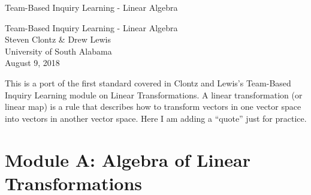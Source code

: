 \documentclass[10pt,]{book}
\theoremstyle{ptxplainnotitle}
\theoremstyle{ptxplaintitle}
\theoremstyle{ptxdefinitionnotitle}
\theoremstyle{ptxdefinitiontitle}
\theoremstyle{ptxdefinitionnotitle}
\theoremstyle{ptxdefinitiontitle}
\theoremstyle{ptxdefinitionnotitle}
\theoremstyle{ptxdefinitiontitle}
\theoremstyle{ptxdefinitionnotitle}
\theoremstyle{ptxdefinitiontitle}
\begin{document}
\frontmatter
\thispagestyle{empty}
{\centering
\vspace*{0.28\textheight}
{\Huge Team-Based Inquiry Learning - Linear Algebra}\\}
\clearpage
\thispagestyle{empty}
\null%
\clearpage
\thispagestyle{empty}
{\centering
\vspace*{0.14\textheight}
{\Huge Team-Based Inquiry Learning - Linear Algebra}\\[3\baselineskip]
{\Large Steven Clontz \& Drew Lewis}\\[0.5\baselineskip]
{\Large University of South Alabama}\\[3\baselineskip]
{\Large August 9, 2018}\\}
\clearpage
\thispagestyle{empty}
\null\clearpage
\hypertarget{p-1}{}%
This is a port of the first standard covered in Clontz and Lewis's Team-Based Inquiry Learning module on Linear Transformations.%
\setcounter{tocdepth}{1}
\renewcommand*\contentsname{Contents}
\tableofcontents
\mainmatter
\hypertarget{p-2}{}%
A linear transformation (or linear map) is a rule that describes how to transform vectors in one vector space into vectors in another vector space. Here I am adding a ``quote'' just for practice.%
\typeout{************************************************}
\typeout{************************************************}
\chapter[{Module A: Algebra of Linear Transformations}]{Module A: Algebra of Linear Transformations}\label{chapter-1}
\typeout{************************************************}
\typeout{************************************************}
\end{document}
